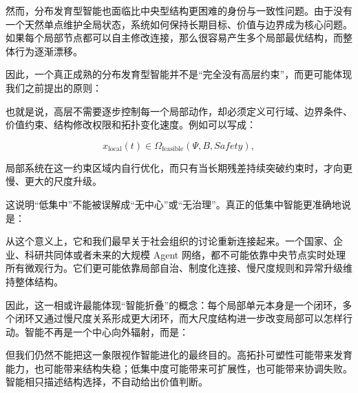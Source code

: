然而，分布发育型智能也面临比中央型结构更困难的身份与一致性问题。由于没有一个天然单点维护全局状态，系统如何保持长期目标、价值与边界成为核心问题。如果每个局部节点都可以自主修改连接，那么很容易产生多个局部最优结构，而整体行为逐渐漂移。

因此，一个真正成熟的分布发育型智能并不是“完全没有高层约束”，而更可能体现我们之前提出的原则：

\begin{statementbox}
\centering
{}
\end{statementbox}

也就是说，高层不需要逐步控制每一个局部动作，却必须定义可行域、边界条件、价值约束、结构修改权限和拓扑变化速度。例如可以写成：

\begin{equation}
x_{\mathrm{local}}(t)
\in
\Omega_{\mathrm{feasible}}
\left(
\Psi,
B,
Safety
\right),
\end{equation}

局部系统在这一约束区域内自行优化，而只有当长期残差持续突破约束时，才向更慢、更大的尺度升级。

这说明“低集中”不能被误解成“无中心”或“无治理”。真正的低集中智能更准确地说是：

\begin{statementbox}
\centering
{}
\end{statementbox}

从这个意义上，它和我们最早关于社会组织的讨论重新连接起来。一个国家、企业、科研共同体或者未来的大规模 Agent 网络，都不可能依靠中央节点实时处理所有微观行为。它们更可能依靠局部自治、制度化连接、慢尺度规则和异常升级维持整体结构。

因此，这一相或许最能体现“智能折叠”的概念：每个局部单元本身是一个闭环，多个闭环又通过慢尺度关系形成更大闭环，而大尺度结构进一步改变局部可以怎样行动。智能不再是一个中心向外辐射，而是：

\begin{statementbox}
\centering
{}
\end{statementbox}

但我们仍然不能把这一象限视作智能进化的最终目的。高拓扑可塑性可能带来发育能力，也可能带来结构失稳；低集中度可能带来可扩展性，也可能带来协调失败。智能相只描述结构选择，不自动给出价值判断。

